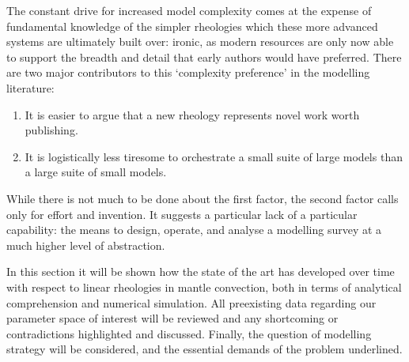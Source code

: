 \documentclass[letterpaper,10pt,english]{jupyterBook}
\begin{document}
\sphinxAtStartPar
The constant drive for increased model complexity comes at the expense of fundamental knowledge of the simpler rheologies which these more advanced systems are ultimately built over: ironic, as modern resources are only now able to support the breadth and detail that early authors would have preferred. There are two major contributors to this ‘complexity preference’ in the modelling literature:
\begin{enumerate}
%
\item {} 
\sphinxAtStartPar
It is easier to argue that a new rheology represents novel work worth publishing.

\item {} 
\sphinxAtStartPar
It is logistically less tiresome to orchestrate a small suite of large models than a large suite of small models.

\end{enumerate}

\sphinxAtStartPar
While there is not much to be done about the first factor, the second factor calls only for effort and invention. It suggests a particular lack of a particular capability: the means to design, operate, and analyse a modelling survey at a much higher level of abstraction.

\sphinxAtStartPar
In this section it will be shown how the state of the art has developed over time with respect to linear rheologies in mantle convection, both in terms of analytical comprehension and numerical simulation. All pre\sphinxhyphen{}existing data regarding our parameter space of interest will be reviewed and any shortcoming or contradictions highlighted and discussed. Finally, the question of modelling strategy will be considered, and the essential demands of the problem underlined.
\end{document}
